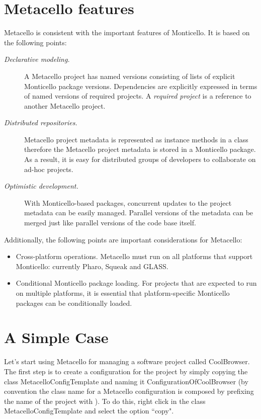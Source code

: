 \documentclass[a4paper,10pt,twoside]{book}
\begin{document}
\section{Metacello features}

Metacello is consistent with the important features of Monticello. It is based on the following points:

\begin{description}
\item[\textit{Declarative modeling.}] A Metacello project has named versions consisting of lists of explicit Monticello package versions. Dependencies are explicitly expressed in terms of named versions of required projects. A \emph{required project} is a reference to another Metacello project.

\item[\textit{ Distributed repositories.}] Metacello project metadata is represented as instance methods in a class therefore the Metacello project metadata is stored in a Monticello package. As a result, it is easy for distributed groups of developers to collaborate on ad-hoc projects.

\item[\textit{ Optimistic development.}] With Monticello-based packages, concurrent updates to the project metadata can be easily managed. Parallel versions of the metadata can be merged just like parallel versions of the code base itself. 

\end{description}

Additionally, the following points are important considerations for Metacello:

\begin{itemize}
\item Cross-platform operations. Metacello must run on all platforms that support Monticello: currently Pharo, Squeak and GLASS.
\item Conditional Monticello package loading. For projects that are expected to run on multiple platforms, it is essential that platform-specific Monticello packages can be conditionally loaded. 
\end{itemize}

\section{A Simple Case}

Let's start using Metacello for managing a software project called CoolBrowser. The first step is to create a configuration for the project by simply copying the class MetacelloConfigTemplate and naming it ConfigurationOfCoolBrowser (by convention the class name for a Metacello configuration is composed by prefixing the name of the project with ). To do this, right click in the class MetacelloConfigTemplate and select the option ``copy". 
\end{document}
